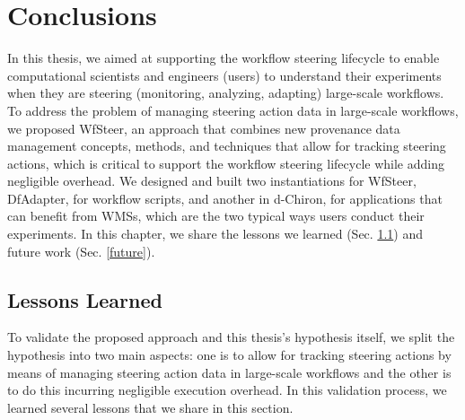 \chapter{Conclusions} \label{chap7}

In this thesis, we aimed at supporting the workflow steering lifecycle to enable computational scientists and engineers (users) to understand their experiments when they are steering (monitoring, analyzing, adapting) large-scale workflows.
To address the problem of managing steering action data in large-scale workflows, we proposed WfSteer, an approach that combines new provenance data management concepts, methods, and techniques that allow for tracking steering actions, which is critical to support the workflow steering lifecycle while adding negligible overhead. We designed and built two instantiations for WfSteer, \ie{} DfAdapter, for workflow scripts, and another in d-Chiron, for applications that can benefit from WMSs, which are the two typical ways users conduct their experiments. In this chapter, we share the lessons we learned (Sec. \ref{lessons}) and future work (Sec. \ref{future}).

\section{Lessons Learned}
\label{lessons}

To validate the proposed approach and this thesis's  hypothesis itself, we split the hypothesis into two main aspects:
one is to allow for tracking steering actions by means of managing steering action data in large-scale workflows and the other is to
do this incurring negligible execution overhead.
In this validation process, we learned several lessons that we share in this section.

